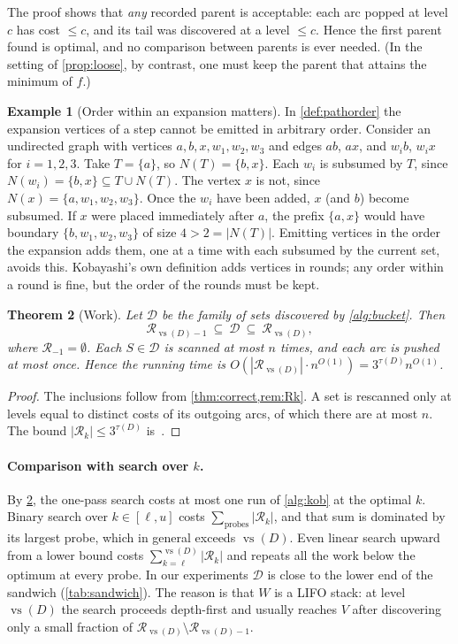 \documentclass[11pt]{article}
\newtheorem{theorem}{Theorem}
\theoremstyle{definition}
\newtheorem{example}[theorem]{Example}
\newcommand{\vs}{\operatorname{vs}}
\newcommand{\Rel}{\mathcal{R}}
\newcommand{\set}[1]{\{#1\}}
\begin{document}
The proof shows that \emph{any} recorded parent is acceptable: each arc
popped at level $c$ has cost $\le c$, and its tail was discovered at a level
$\le c$. Hence the first parent found is optimal, and no comparison between
parents is ever needed. (In the setting of \cref{prop:loose}, by contrast,
one must keep the parent that attains the minimum of $f$.)

\begin{example}[Order within an expansion matters]\label{ex:order}
In \cref{def:pathorder} the expansion vertices of a step cannot be emitted
in arbitrary order. Consider an undirected graph with vertices
$a,b,x,w_1,w_2,w_3$ and edges $ab$, $ax$, and $w_ib$, $w_ix$ for $i=1,2,3$.
Take $T=\set a$, so $N(T)=\set{b,x}$. Each $w_i$ is subsumed by $T$, since
$N(w_i)=\set{b,x}\subseteq T\cup N(T)$. The vertex $x$ is not, since
$N(x)=\set{a,w_1,w_2,w_3}$. Once the $w_i$ have been added, $x$ (and $b$)
become subsumed. If $x$ were placed immediately after $a$, the prefix
$\set{a,x}$ would have boundary $\set{b,w_1,w_2,w_3}$ of size $4>2=|N(T)|$.
Emitting vertices in the order the expansion adds them, one at a time with
each subsumed by the current set, avoids this. Kobayashi's own definition
adds vertices in rounds; any order within a round is fine, but the order of
the rounds must be kept.
\end{example}

\begin{theorem}[Work]\label{thm:work}
Let $\mathcal{D}$ be the family of sets discovered by \cref{alg:bucket}.
Then
\[
  \Rel_{\vs(D)-1}\ \subseteq\ \mathcal{D}\ \subseteq\ \Rel_{\vs(D)},
\]
where $\Rel_{-1}=\emptyset$. Each $S\in\mathcal{D}$ is scanned at most $n$
times, and each arc is pushed at most once. Hence the running time is
$O(|\Rel_{\vs(D)}|\cdot n^{O(1)})=3^{\tau(D)}n^{O(1)}$.
\end{theorem}
\begin{proof}
The inclusions follow from \cref{thm:correct,rem:Rk}. A set is rescanned
only at levels equal to distinct costs of its outgoing arcs, of which there
are at most $n$. The bound $|\Rel_k|\le 3^{\tau(D)}$ is~\cite[Lemma~3]{Kob15}.
\end{proof}

\paragraph{Comparison with search over $k$.}
By \cref{thm:work}, the one-pass search costs at most one run of
\cref{alg:kob} at the optimal $k$. Binary search over
$k\in[\ell,u]$ costs $\sum_{\text{probes}}|\Rel_{k}|$, and that sum is
dominated by its largest probe, which in general exceeds $\vs(D)$. Even
linear search upward from a lower bound costs
$\sum_{k=\ell}^{\vs(D)}|\Rel_k|$ and repeats all the work below the optimum
at every probe. In our experiments $\mathcal{D}$ is close to the lower end
of the sandwich (\cref{tab:sandwich}). The reason is that $W$ is a LIFO
stack: at level $\vs(D)$ the search proceeds depth-first and usually reaches
$V$ after discovering only a small fraction of
$\Rel_{\vs(D)}\setminus\Rel_{\vs(D)-1}$.
\end{document}
